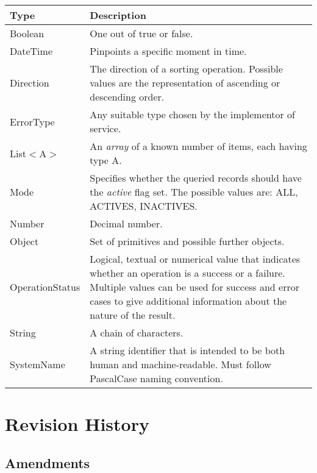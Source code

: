 \documentclass[a4paper]{arrowhead}
\newcommand{\pdef}[1]{{\textcolor{ArrowheadGrey}{#1\label{sec:model:primitives:#1}\label{sec:model:primitives:#1s}\label{sec:model:primitives:#1es}}}}
\begin{document}
\begin{table}[ht!]
\begin{tabularx}{\textwidth}{| p{3cm} | X |} \hline
\rowcolor{gray!33} Type & Description \\ \hline
\pdef{Boolean}          & One out of true or false. \\ \hline
\pdef{DateTime}         & Pinpoints a specific moment in time. \\ \hline
\pdef{Direction}        & The direction of a sorting operation. Possible values are the representation of ascending or descending order. \\ \hline
\pdef{ErrorType}        & Any suitable type chosen by the implementor of service. \\ \hline
\pdef{List}$<$A$>$      & An \textit{array} of a known number of items, each having type A. \\ \hline
\pdef{Mode}             & Specifies whether the queried records should have the \textit{active} flag set. The possible values are: ALL, ACTIVES, INACTIVES. \\ \hline
\pdef{Number}           & Decimal number. \\ \hline
\pdef{Object}           & Set of primitives and possible further objects. \\ \hline
\pdef{OperationStatus}  & Logical, textual or numerical value that indicates whether an operation is a success or a failure. Multiple values can be used for success and error cases to give additional information about the nature of the result. \\ \hline
\pdef{String}           & A chain of characters. \\ \hline
\pdef{SystemName}       & A string identifier that is intended to be both human and machine-readable. Must follow PascalCase naming convention. \\ \hline
\end{tabularx}
\end{table}

\newpage




\newpage

\section{Revision History}
\subsection{Amendments}
\end{document}
